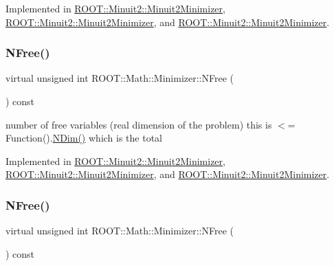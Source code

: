 Implemented in \mbox{\hyperlink{classROOT_1_1Minuit2_1_1Minuit2Minimizer_a6ed2c7d99296e222f0f43295e302eb9e}{R\+O\+O\+T\+::\+Minuit2\+::\+Minuit2\+Minimizer}}, \mbox{\hyperlink{classROOT_1_1Minuit2_1_1Minuit2Minimizer_a6ed2c7d99296e222f0f43295e302eb9e}{R\+O\+O\+T\+::\+Minuit2\+::\+Minuit2\+Minimizer}}, and \mbox{\hyperlink{classROOT_1_1Minuit2_1_1Minuit2Minimizer_a6ed2c7d99296e222f0f43295e302eb9e}{R\+O\+O\+T\+::\+Minuit2\+::\+Minuit2\+Minimizer}}.

\mbox{\label{classROOT_1_1Math_1_1Minimizer_a75a7cd8dc0d764ecc9d82dd8f83aab24}} 
\subsubsection{\texorpdfstring{NFree()}{NFree()}\hspace{0.1cm}{\footnotesize\ttfamily [1/3]}}
{\footnotesize\ttfamily virtual unsigned int R\+O\+O\+T\+::\+Math\+::\+Minimizer\+::\+N\+Free (\begin{DoxyParamCaption}{ }\end{DoxyParamCaption}) const\hspace{0.3cm}{\ttfamily [pure virtual]}}

number of free variables (real dimension of the problem) this is $<$= Function().\mbox{\hyperlink{classROOT_1_1Math_1_1Minimizer_aecb9b9ee5c6a9fd7db3196ae3ac5e335}{N\+Dim()}} which is the total 

Implemented in \mbox{\hyperlink{classROOT_1_1Minuit2_1_1Minuit2Minimizer_a0aa136c5a94d1e5c6bfcbfb98da7ad2d}{R\+O\+O\+T\+::\+Minuit2\+::\+Minuit2\+Minimizer}}, \mbox{\hyperlink{classROOT_1_1Minuit2_1_1Minuit2Minimizer_a0aa136c5a94d1e5c6bfcbfb98da7ad2d}{R\+O\+O\+T\+::\+Minuit2\+::\+Minuit2\+Minimizer}}, and \mbox{\hyperlink{classROOT_1_1Minuit2_1_1Minuit2Minimizer_a0aa136c5a94d1e5c6bfcbfb98da7ad2d}{R\+O\+O\+T\+::\+Minuit2\+::\+Minuit2\+Minimizer}}.

\mbox{\label{classROOT_1_1Math_1_1Minimizer_a75a7cd8dc0d764ecc9d82dd8f83aab24}} 
\subsubsection{\texorpdfstring{NFree()}{NFree()}\hspace{0.1cm}{\footnotesize\ttfamily [2/3]}}
{\footnotesize\ttfamily virtual unsigned int R\+O\+O\+T\+::\+Math\+::\+Minimizer\+::\+N\+Free (\begin{DoxyParamCaption}{ }\end{DoxyParamCaption}) const\hspace{0.3cm}{\ttfamily [pure virtual]}}

